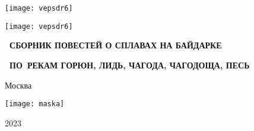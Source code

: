 \begin{titlepage}
	\newpage
	\begin{center}
		\Large \textbf \MyVarAuthorName
	\end{center}	
	\vspace{0.75cm}	
	\begin{center}
	\texttt{[image: vepsdr6]}
	\end{center}	
	\begin{center}
		\Huge{}
	\end{center}	
%
	\begin{center}
	\texttt{[image: vepsdr6]}
	\end{center}
%
	\begin{center}
		\footnotesize
%	
		{
		\textbf{~СБОРНИК ПОВЕСТЕЙ О СПЛАВАХ НА БАЙДАРКЕ}}
		
		{
		\textbf{~ПО~РЕКАМ ГОРЮН, ЛИДЬ, ЧАГОДА, ЧАГОДОЩА, ПЕСЬ}}		
	\end{center}
%
	\vspace{\fill}	
	\begin{center}\normalsize Москва\end{center}
	\vspace{-1.1cm}
	\begin{center}\texttt{[image: maska]}\end{center}
	\vspace{-1.24cm}
	\begin{center}\normalsize 2023\end{center}	
\end{titlepage}